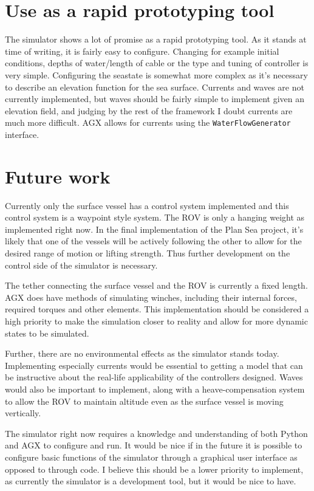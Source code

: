 \section{Use as a rapid prototyping tool}
The simulator shows a lot of promise as a rapid prototyping tool. As it stands at time of writing, it is fairly easy to configure. Changing for example initial conditions, depths of water/length of cable or the type and tuning of controller is very simple. Configuring the seastate is somewhat more complex as it's necessary to describe an elevation function for the sea surface. Currents and waves are not currently implemented, but waves should be fairly simple to implement given an elevation field, and judging by the rest of the framework I doubt currents are much more difficult. AGX allows for currents using the \texttt{WaterFlowGenerator} interface. 

\section{Future work}
Currently only the surface vessel has a control system implemented and this control system is a waypoint style system. The ROV is only a hanging weight as implemented right now. In the final implementation of the Plan Sea project, it's likely that one of the vessels will be actively following the other to allow for the desired range of motion or lifting strength. Thus further development on the control side of the simulator is necessary. 

The tether connecting the surface vessel and the ROV is currently a fixed length. AGX does have methods of simulating winches, including their internal forces, required torques and other elements. This implementation should be considered a high priority to make the simulation closer to reality and allow for more dynamic states to be simulated. 

Further, there are no environmental effects as the simulator stands today. Implementing especially currents would be essential to getting a model that can be instructive about the real-life applicability of the controllers designed. Waves would also be important to implement, along with a heave-compensation system to allow the ROV to maintain altitude even as the surface vessel is moving vertically. 

The simulator right now requires a knowledge and understanding of both Python and AGX to configure and run. It would be nice if in the future it is possible to configure basic functions of the simulator through a graphical user interface as opposed to through code. I believe this should be a lower priority to implement, as currently the simulator is a development tool, but it would be nice to have. 

